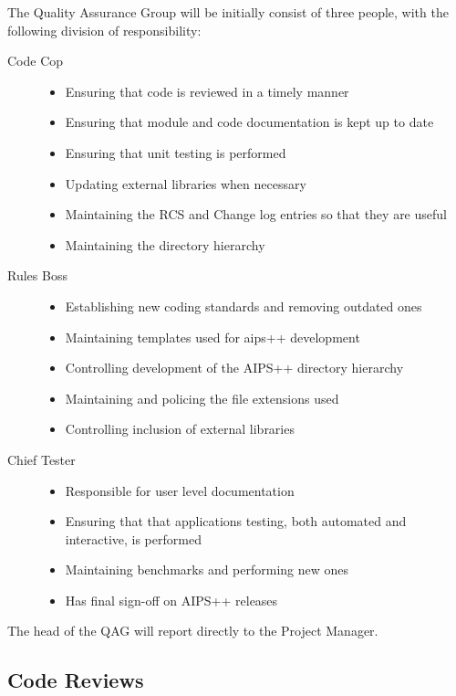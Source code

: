 The Quality Assurance Group will be initially consist of three people,
with the following division of responsibility:

\begin{description}
\item[Code Cop]
\begin{itemize}
\item Ensuring that code is reviewed in a timely manner
\item Ensuring that module and code documentation is kept up to date 
\item Ensuring that unit testing is performed
\item Updating external libraries when necessary
\item Maintaining the RCS and Change log entries so that they are useful
\item Maintaining the directory hierarchy
\end{itemize}

\item[Rules Boss]
\begin{itemize}
\item Establishing new coding standards and removing outdated ones
\item Maintaining templates used for aips++ development
\item Controlling development of the AIPS++ directory hierarchy
\item Maintaining and policing the file extensions used
\item Controlling inclusion of external libraries
\end{itemize}

\item[Chief Tester]
\begin{itemize}
\item Responsible for user level documentation
\item Ensuring that that applications testing, both automated and
  interactive, is performed
\item Maintaining benchmarks and performing new ones
\item Has final sign-off on AIPS++ releases
\end{itemize}
\end{description}

The head of the QAG will report directly to the Project Manager.

\subsection{Code Reviews}

